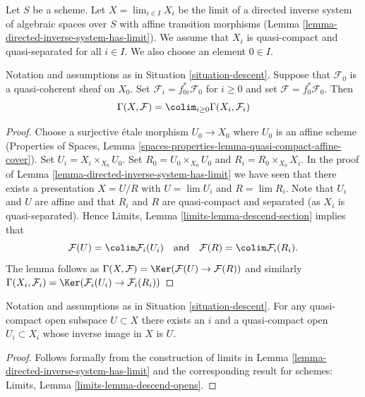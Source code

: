 \begin{situation}
\label{situation-descent}
Let $S$ be a scheme. Let $X = \lim_{i \in I} X_i$ be the limit of a directed
inverse system of algebraic spaces over $S$ with affine transition morphisms
(Lemma \ref{lemma-directed-inverse-system-has-limit}).
We assume that $X_i$ is quasi-compact and quasi-separated for all $i \in I$.
We also choose an element $0 \in I$.
\end{situation}

\begin{lemma}
\label{lemma-descend-section}
Notation and assumptions as in Situation \ref{situation-descent}.
Suppose that $\mathcal{F}_0$ is a quasi-coherent sheaf on $X_0$.
Set $\mathcal{F}_i = f_{0i}^*\mathcal{F}_0$ for $i \geq 0$ and set
$\mathcal{F} = f_0^*\mathcal{F}_0$. Then
$$
\Gamma(X, \mathcal{F}) = \colim_{i \geq 0} \Gamma(X_i, \mathcal{F}_i)
$$
\end{lemma}

\begin{proof}
Choose a surjective \'etale morphism $U_0 \to X_0$ where $U_0$ is an affine
scheme (Properties of Spaces, Lemma
\ref{spaces-properties-lemma-quasi-compact-affine-cover}).
Set $U_i = X_i \times_{X_0} U_0$.
Set $R_0 = U_0 \times_{X_0} U_0$ and $R_i = R_0 \times_{X_0} X_i$.
In the proof of Lemma \ref{lemma-directed-inverse-system-has-limit} we have
seen that there exists a presentation $X = U/R$ with
$U = \lim U_i$ and $R = \lim R_i$.
Note that $U_i$ and $U$ are affine and that $R_i$ and $R$ are
quasi-compact and separated (as $X_i$ is quasi-separated). Hence
Limits, Lemma \ref{limits-lemma-descend-section}
implies that
$$
\mathcal{F}(U) = \colim \mathcal{F}_i(U_i)
\quad\text{and}\quad
\mathcal{F}(R) = \colim \mathcal{F}_i(R_i).
$$
The lemma follows as
$\Gamma(X, \mathcal{F}) = \Ker(\mathcal{F}(U) \to \mathcal{F}(R))$
and similarly
$\Gamma(X_i, \mathcal{F}_i) =
\Ker(\mathcal{F}_i(U_i) \to \mathcal{F}_i(R_i))$
\end{proof}

\begin{lemma}
\label{lemma-descend-opens}
Notation and assumptions as in Situation \ref{situation-descent}.
For any quasi-compact open subspace $U \subset X$ there exists an $i$
and a quasi-compact open $U_i \subset X_i$ whose inverse image in $X$ is $U$.
\end{lemma}

\begin{proof}
Follows formally from the construction of limits in
Lemma \ref{lemma-directed-inverse-system-has-limit}
and the corresponding result for schemes:
Limits, Lemma \ref{limits-lemma-descend-opens}.
\end{proof}

